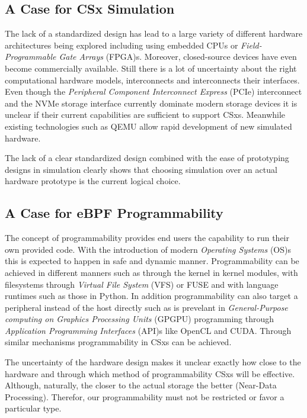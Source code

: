 \documentclass[conference]{IEEEtran}
\begin{document}
\subsection*{A Case for CSx Simulation}

The lack of a standardized design has lead to a large variety of different
hardware architectures being explored including using embedded CPUs or
\textit{Field-Programmable Gate Arrays} (FPGA)s. Moreover, closed-source
devices have even become commercially available. Still there is a lot of
uncertainty about the right computational hardware models, interconnects and
interconnects their interfaces. Even though the \textit{Peripheral Component
Interconnect Express} (PCIe) interconnect and the NVMe storage interface
currently dominate modern storage devices it is unclear if their current
capabilities are sufficient to support CSxs. Meanwhile existing technologies
such as QEMU allow rapid development of new simulated hardware.

The lack of a clear standardized design combined with the ease of prototyping
designs in simulation clearly shows that choosing simulation over an actual
hardware prototype is the current logical choice.

\subsection*{A Case for eBPF Programmability}

The concept of programmability provides end users the capability to run their
own provided code. With the introduction of modern \textit{Operating Systems}
(OS)s this is expected to happen in safe and dynamic manner. Programmability
can be achieved in different manners such as through the kernel in kernel
modules, with filesystems through \textit{Virtual File System} (VFS) or FUSE and
with language runtimes such as those in Python. In addition programmability can
also target a peripheral instead of the host directly such as is prevelant in
\textit{General-Purpose computing on Graphics Processing Units} (GPGPU)
programming through \textit{Application Programming Interfaces} (API)s like
OpenCL\cite{opencl} and CUDA\cite{cuda}. Through similar mechanisms
programmability in CSxs can be achieved.

The uncertainty of the hardware design makes it unclear exactly how close to the
hardware and through which method of programmability CSxs will be effective.
Although, naturally, the closer to the actual storage the better
(Near-Data Processing). Therefor, our programmability must not be restricted or
favor a particular type.
\end{document}
